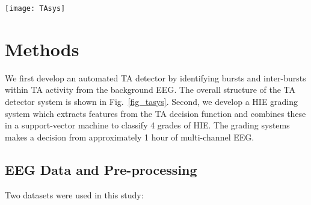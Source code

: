 \documentclass[conference]{IEEEtran}
\begin{document}


\begin{figure*}[!t]
	\centering
	\texttt{[image: TAsys]}
	\caption{Overview of proposed system for detecting trac\'e alternant (TA) activity. SVM: support vector machine; IBI: inter-burst interval.}
	\label{fig_tasys}
\end{figure*}

\section{Methods}
We first develop an automated TA detector by identifying bursts and inter-bursts within TA activity from the background EEG. The overall structure of the TA detector system is shown in Fig.~\ref{fig_tasys}. Second, we develop a HIE grading system which extracts features from the TA decision function and combines these in a support-vector machine to classify 4 grades of HIE. The grading systems makes a decision from approximately 1 hour of multi-channel EEG.

\subsection{EEG Data and Pre-processing}
Two datasets were used in this study:
\end{document}
